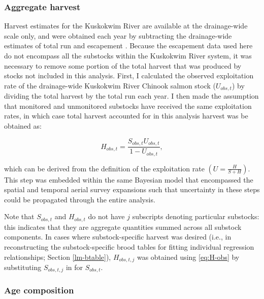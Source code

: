 \documentclass[12pt,]{book}
\theoremstyle{definition}
\theoremstyle{definition}
\theoremstyle{definition}
\theoremstyle{remark}
\begin{document}
\subsubsection{Aggregate harvest}\label{harv-expansion}

\noindent
Harvest estimates for the Kuskokwim River are available at the
drainage-wide scale only, and were obtained each year by subtracting the
drainage-wide estimates of total run and escapement
\citep{liller-etal-2018}. Because the escapement data used here do not
encompass all the substocks within the Kuskokwim River system, it was
necessary to remove some portion of the total harvest that was produced
by stocks not included in this analysis. First, I calculated the
observed exploitation rate of the drainage-wide Kuskokwim River Chinook
salmon stock (\(U_{obs,t}\)) by dividing the total harvest by the total
run each year. I then made the assumption that monitored and unmonitored
substocks have received the same exploitation rates, in which case total
harvest accounted for in this analysis harvest was be obtained as:

\begin{equation}
  H_{obs,t} = \frac{S_{obs,t} U_{obs,t}}{1-U_{obs,t}},
  \label{eq:H-obs}
\end{equation}

\noindent
which can be derived from the definition of the exploitation rate
\(\left(U = \frac{H}{S+H}\right)\). This step was embedded within the
same Bayesian model that encompassed the spatial and temporal aerial
survey expansions such that uncertainty in these steps could be
propagated through the entire analysis.

Note that \(S_{obs,t}\) and \(H_{obs,t}\) do not have \(j\) subscripts
denoting particular substocks: this indicates that they are aggregate
quantities summed across all substock components. In cases where
substock-specific harvest was desired (i.e., in reconstructing the
substock-specific brood tables for fitting individual regression
relationships; Section \ref{lm-btable}), \(H_{obs,t,j}\) was obtained
using \eqref{eq:H-obs} by substituting \(S_{obs,t,j}\) in for
\(S_{obs,t}\).

\subsubsection{Age composition}\label{age-comp}
\end{document}
